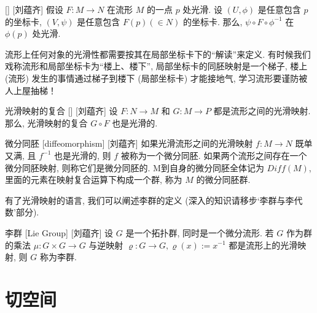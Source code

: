 \documentclass[UTF8]{ctexart}
\begin{document}
        \begin{ppt}
            []
            {}
            []
            [刘蕴齐]
            假设  \(F: M \to N \)  在流形 \(M\) 的一点 \(p\) 处光滑. 设  \((U, \phi)\)  是任意包含 \(p\) 的坐标卡,  \((V, \psi)\) 是任意包含 \(F(p)(\in N)\) 的坐标卡.  那么,  \( \psi \circ F \circ \phi^{-1} \) 在 \(\phi(p)\) 处光滑. 
        \end{ppt}
        
        \begin{rmk}
            []
            流形上任何对象的光滑性都需要按其在局部坐标卡下的“解读”来定义. 
            有时候我们戏称流形和局部坐标卡为“楼上、楼下”, 局部坐标卡的同胚映射是一个梯子, 楼上 (流形) 发生的事情通过梯子到楼下 (局部坐标卡) 才能接地气, 
            学习流形要谨防被人上屋抽梯！
        \end{rmk}

        \begin{ppt}
            []
            {光滑映射的复合}
            []
            [刘蕴齐]
            设 \(F: N \to M\)  和  \(G: M \to P\) 都是流形之间的光滑映射. 那么, 光滑映射的复合 \(G \circ F\) 也是光滑的. 
        \end{ppt}
        
        \vspace{10pt}
        
        \begin{dfn}
            []
            {微分同胚}
            [diffeomorphism]
            [刘蕴齐]
            如果光滑流形之间的光滑映射 \( f:M \to N\) 既单又满, 且 \(f^{-1}\) 也是光滑的, 
            则 \(f\) 被称为一个微分同胚. 
            如果两个流形之间存在一个微分同胚映射, 则称它们是微分同胚的. 
            M到自身的微分同胚全体记为 \(Diff(M)\),
            里面的元素在映射复合运算下构成一个群, 称为 \(M\) 的微分同胚群. 
        \end{dfn}

        有了光滑映射的语言, 我们可以阐述李群的定义 (深入的知识请移步‘李群与李代数’部分). 

        \begin{dfn}
            []
            {李群}
            [Lie Group]
            [刘蕴齐]
            设 \(G\) 是一个拓扑群, 同时是一个微分流形. 若 \(G\) 作为群的乘法 \(\mu: G \times G \to G\) 与逆映射
             \(\varrho: G \to G, \varrho(x):= x^{-1}\) 
            都是流形上的光滑映射, 则 \(G\) 称为李群. 
        \end{dfn}

    
\section{切空间}
\end{document}
